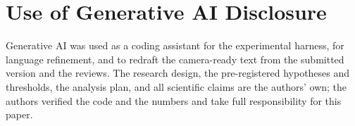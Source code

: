 \section*{Use of Generative AI Disclosure}
Generative AI was used as a coding assistant for the experimental harness, for language
refinement, and to redraft the camera-ready text from the submitted version and the reviews. The research design, the pre-registered hypotheses and
thresholds, the analysis plan, and all scientific claims are the authors' own; the authors
verified the code and the numbers and take full responsibility for this paper.
